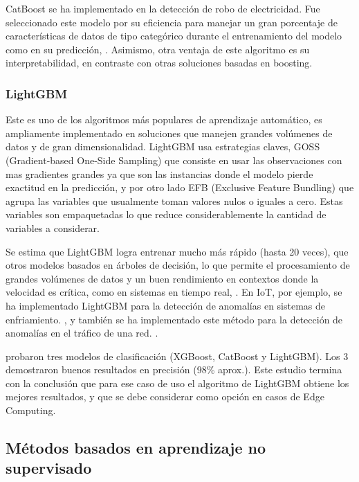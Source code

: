 \documentclass[11pt,a4paper,spanish]{book}
\numberwithin{equation}{chapter}
\numberwithin{figure}{chapter}
\begin{document}
CatBoost se ha implementado en la detección de robo de electricidad. Fue seleccionado este modelo por su eficiencia para manejar un gran porcentaje de características de datos de tipo categórico durante el entrenamiento del modelo como en su predicción, \cite{hussain2021catboost}. Asimismo, otra ventaja de este algoritmo es su interpretabilidad, en contraste con otras soluciones basadas en boosting. 


\subsubsection{LightGBM}


Este es uno de los algoritmos más populares de aprendizaje automático, es ampliamente implementado en soluciones que manejen grandes volúmenes de datos y de gran dimensionalidad. LightGBM usa estrategias claves, GOSS (Gradient-based One-Side Sampling) que consiste en usar las observaciones con mas gradientes grandes ya que son las instancias donde el modelo pierde exactitud en la predicción, y por otro lado EFB (Exclusive Feature Bundling) que agrupa las variables que usualmente toman valores nulos o iguales a cero. Estas variables son empaquetadas lo que reduce considerablemente la cantidad de variables a considerar.


Se estima que LightGBM logra entrenar mucho más rápido (hasta 20 veces), que otros modelos basados en árboles de decisión, lo que permite el procesamiento de grandes volúmenes de datos y un buen rendimiento en contextos donde la velocidad es crítica, como en sistemas en tiempo real, \cite{ke2017lightgbm}. En IoT, por ejemplo, se ha implementado LightGBM para la detección de anomalías en sistemas de enfriamiento. \cite{yanabe2020lightgbm}, y también se ha implementado este método para la detección de anomalías en el tráfico de una red. \cite{islam2020lightgbm}. 


\cite{delasmorenas2025bearing} probaron tres modelos de clasificación (XGBoost, CatBoost y LightGBM). Los 3 demostraron buenos resultados en precisión (98\% aprox.). Este estudio termina con la conclusión que para ese caso de uso el algoritmo de LightGBM obtiene los mejores resultados, y que se debe considerar como opción en casos de Edge Computing.


\subsection{Métodos basados en aprendizaje no supervisado}
\end{document}
